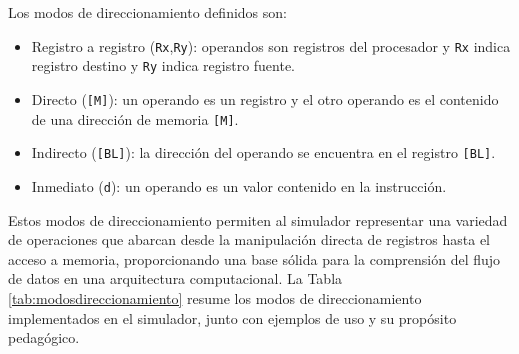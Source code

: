 \documentclass[12pt,oneside]{templates/unerthesis}
\begin{document}
Los modos de direccionamiento definidos son:

\begin{itemize}
\item
  Registro a registro (\texttt{Rx},\texttt{Ry}): operandos son registros del procesador y \texttt{Rx} indica registro destino y \texttt{Ry} indica registro fuente.
\item
  Directo (\texttt{{[}M{]}}): un operando es un registro y el otro operando es el contenido de una dirección de memoria \texttt{{[}M{]}}.
\item
  Indirecto (\texttt{{[}BL{]}}): la dirección del operando se encuentra en el registro \texttt{{[}BL{]}}.
\item
  Inmediato (\texttt{d}): un operando es un valor contenido en la instrucción.
\end{itemize}

Estos modos de direccionamiento permiten al simulador representar una variedad de operaciones que abarcan desde la manipulación directa de registros hasta el acceso a memoria, proporcionando una base sólida para la comprensión del flujo de datos en una arquitectura computacional. La Tabla \ref{tab:modosdireccionamiento} resume los modos de direccionamiento implementados en el simulador, junto con ejemplos de uso y su propósito pedagógico.
\end{document}
